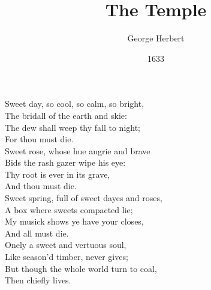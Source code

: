 \documentclass[11pt]{article}
\title{The Temple}
\author{George Herbert}
\date{1633}
\begin{document}
\maketitle

\begin{poem}
Sweet day, so cool, so calm, so bright,\\
The bridall of the earth and skie:\\
The dew shall weep thy fall to night;\\
\vin For thou must die.\\

Sweet rose, whose hue angrie and brave\\
Bids the rash gazer wipe his eye:\\
Thy root is ever in its grave,\\
\vin And thou must die.\\

Sweet spring, full of sweet dayes and roses,\\
A box where sweets compacted lie;\\
My musick shows ye have your closes,\\
\vin And all must die.\\

Onely a sweet and vertuous soul,\\
Like season'd timber, never gives;\\
But though the whole world turn to coal,\\
\vin Then chiefly lives.\\
\end{poem}
\tailpiece
\end{document}
